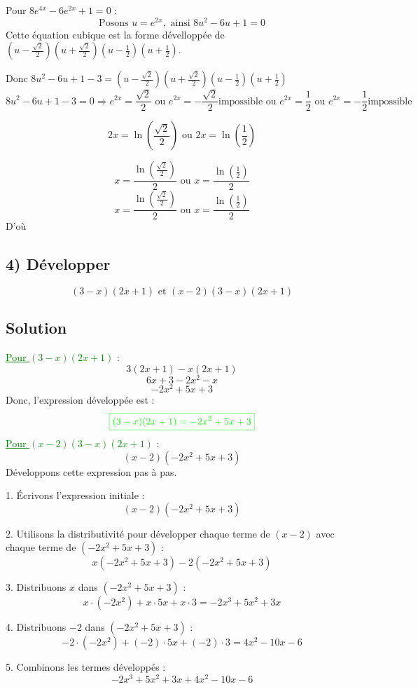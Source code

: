 \documentclass[12pt]{article}
\begin{document}
Pour \(8e^{4x} - 6e^{2x} + 1 = 0\) :
\[
\text{Posons } u = e^{2x}, \text{ ainsi } 8u^2 - 6u + 1 = 0
\]
Cette équation cubique est la forme dévelloppée de \((u-\frac{\sqrt{2}}{2})(u+\frac{\sqrt{2}}{2})(u-\frac{1}{2})(u+\frac{1}{2})\).

Donc $8u^2 - 6u + 1 - 3=(u-\frac{\sqrt{2}}{2})(u+\frac{\sqrt{2}}{2})(u-\frac{1}{2})(u+\frac{1}{2})$
\[
8u^2 - 6u + 1 - 3 = 0 \Longrightarrow e^{2x}=\frac{\sqrt{2}}{2} \text{ ou } e^{2x}=-\frac{\sqrt{2}}{2} \text{impossible ou } e^{2x}=\frac{1}{2} \text{ ou } e^{2x}=-\frac{1}{2} \text{impossible}
\]

\[
2x=\ln(\frac{\sqrt{2}}{2}) \text{ ou } 2x=\ln(\frac{1}{2})
\]

\[
x=\frac{\ln(\frac{\sqrt{2}}{2})}{2} \text{ ou } x=\frac{\ln(\frac{1}{2})}{2}
\]
\[
x=\frac{\ln(\frac{\sqrt{2}}{2})}{2} \text{ ou } x=\frac{\ln(\frac{1}{2})}{2}
\]
D'où \textcolor{green}{}

\subsection*{4) Développer } 
\[
(3-x)(2x+1) \text{ et } (x-2)(3-x)(2x+1)
\]

\subsection*{Solution}
\textcolor{green}{\underline{Pour \((3-x)(2x+1)\)} }:
\[
3(2x+1) - x(2x+1)
\]
\[
6x + 3 - 2x^2 - x
\]
\[
-2x^2 + 5x + 3
\]
Donc, l'expression développée est :
\[\textcolor{green}{\boxed{
(3-x)(2x+1) = -2x^2 + 5x + 3
}}\]
\textcolor{green}{\underline{Pour \((x-2)(3-x)(2x+1)\)} }:
\[
(x-2)(-2x^2 + 5x + 3)
\]
Développons cette expression pas à pas.

1. Écrivons l'expression initiale :
\[
(x-2)(-2x^2 + 5x + 3)
\]

2. Utilisons la distributivité pour développer chaque terme de \((x-2)\) avec chaque terme de \((-2x^2 + 5x + 3)\) :
\[
x(-2x^2 + 5x + 3) - 2(-2x^2 + 5x + 3)
\]

3. Distribuons \(x\) dans \((-2x^2 + 5x + 3)\) :
\[
x \cdot (-2x^2) + x \cdot 5x + x \cdot 3 = -2x^3 + 5x^2 + 3x
\]

4. Distribuons \(-2\) dans \((-2x^2 + 5x + 3)\) :
\[
-2 \cdot (-2x^2) + (-2) \cdot 5x + (-2) \cdot 3 = 4x^2 - 10x - 6
\]

5. Combinons les termes développés :
\[
-2x^3 + 5x^2 + 3x + 4x^2 - 10x - 6
\]
\end{document}
